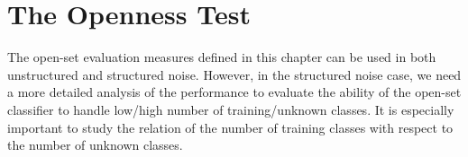 





\section{The Openness Test}\label{chap:eval_methods:sec:openness}

The open-set evaluation measures defined in this chapter can be used in both unstructured and structured noise. However, in the structured noise case, we need a more detailed analysis of the performance to evaluate the ability of the open-set classifier to handle low/high number of training/unknown classes. It is especially important to study the relation of the number of training classes with respect to the number of unknown classes. 

